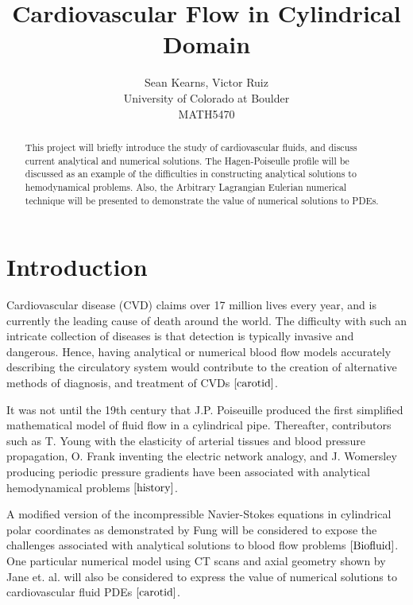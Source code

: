 \documentclass[12pt, a4paper]{article}
\theoremstyle{plain}
\theoremstyle{definition}
\theoremstyle{remark}
\begin{document}
%
\title{Cardiovascular Flow in Cylindrical Domain}
\author{Sean Kearns, Victor Ruiz\\
University of Colorado at Boulder\\
MATH5470}
\maketitle
\begin{abstract}
This project will briefly introduce the study of cardiovascular fluids, and discuss current analytical and numerical solutions. The Hagen-Poiseulle profile will be discussed as an example of the difficulties in constructing analytical solutions to hemodynamical problems. Also, the Arbitrary Lagrangian Eulerian numerical technique will be presented to demonstrate the value of numerical solutions to PDEs.
\end{abstract}
\section{Introduction}
Cardiovascular disease (CVD) claims over 17 million lives every year, and is currently the leading cause of death around the world. The difficulty with such an intricate collection of diseases is that detection is typically invasive and dangerous. Hence, having analytical or numerical blood flow models accurately describing the circulatory system would contribute to the creation of alternative methods of diagnosis, and treatment of CVDs $\cite{carotid}$.

It was not until the 19th century that J.P. Poiseuille produced the first simplified mathematical model of fluid flow in a cylindrical pipe. Thereafter, contributors such as T. Young with the elasticity of arterial tissues and blood pressure propagation, O. Frank inventing the electric network analogy, and J. Womersley producing periodic pressure gradients have been associated with analytical hemodynamical problems $\cite{history}$. 

A modified version of the incompressible Navier-Stokes equations in cylindrical polar coordinates as demonstrated by Fung will be considered to expose the challenges associated with analytical solutions to blood flow problems $\cite{Biofluid}$. One particular numerical model using CT scans and axial geometry shown by Jane et. al. will also be considered to express the value of numerical solutions to cardiovascular fluid PDEs $\cite{carotid}$.
\end{document}
